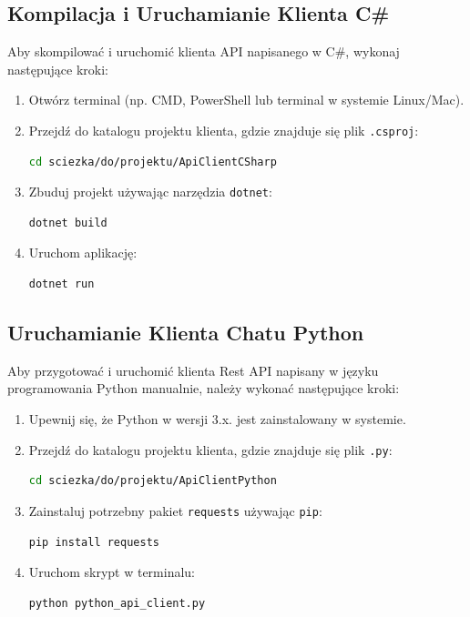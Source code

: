 \subsection{Kompilacja i Uruchamianie Klienta C\#}
\begin{spacing}{1.5} %
    Aby skompilować i uruchomić klienta API napisanego w C\#, wykonaj następujące kroki:
    \begin{enumerate}
        \item Otwórz terminal (np. CMD, PowerShell lub terminal w systemie Linux/Mac).
        \item Przejdź do katalogu projektu klienta, gdzie znajduje się plik \texttt{.csproj}:
        \begin{lstlisting}[language=bash]
    cd sciezka/do/projektu/ApiClientCSharp
        \end{lstlisting}
        \item Zbuduj projekt używając narzędzia \texttt{dotnet}:
        \begin{lstlisting}[language=bash]
    dotnet build
        \end{lstlisting}
        \item Uruchom aplikację:
        \begin{lstlisting}[language=bash]
    dotnet run
        \end{lstlisting}
    \end{enumerate}

\end{spacing} %

\subsection{Uruchamianie Klienta Chatu Python}
\begin{spacing}{1.5} %
    Aby przygotować i uruchomić klienta Rest API napisany w języku programowania Python manualnie, należy wykonać następujące kroki:
    \begin{enumerate}
        \item Upewnij się, że Python w wersji 3.x. jest zainstalowany w systemie.
        \item Przejdź do katalogu projektu klienta, gdzie znajduje się plik \texttt{.py}:
        \begin{lstlisting}[language=bash]
    cd sciezka/do/projektu/ApiClientPython
        \end{lstlisting}
        \item Zainstaluj potrzebny pakiet \texttt{requests} używając \texttt{pip}:
        \begin{lstlisting}[language=bash]
    pip install requests
        \end{lstlisting}
        \item Uruchom skrypt w terminalu:
        \begin{lstlisting}[language=bash]
    python python_api_client.py
        \end{lstlisting}
    \end{enumerate}
\end{spacing} %

